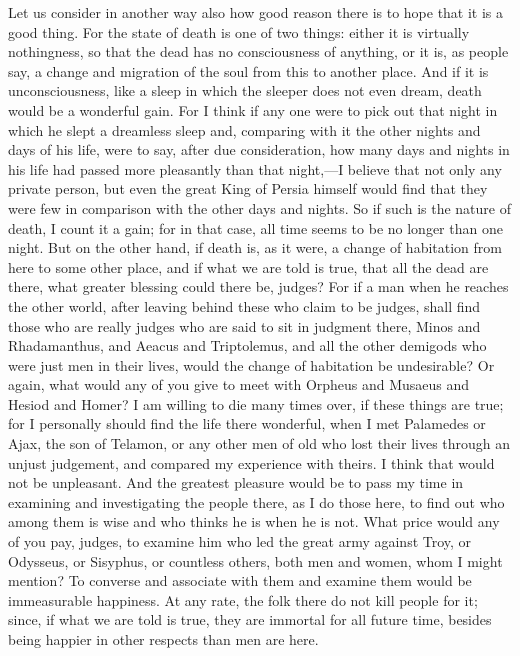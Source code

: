 Let us consider in another way also how good reason there is to hope that it is a good thing. For the state of death is one of two things: either it is virtually nothingness, so that the dead has no consciousness of anything, or it is, as people say, a change and migration of the soul from this to another place. And if it is unconsciousness,  like a sleep in which the sleeper does not even dream, death would be a wonderful gain. For I think if any one were to pick out that night in which he slept a dreamless sleep and, comparing with it the other nights and days of his life, were to say, after due consideration, how many days and nights in his life had passed more pleasantly than that night,—I believe that not only any private person, but even the great King of Persia himself  would find that they were few in comparison with the other days and nights. So if such is the nature of death, I count it a gain; for in that case, all time seems to be no longer than one night. But on the other hand, if death is, as it were, a change of habitation from here to some other place, and if what we are told is true, that all the dead are there, what greater blessing could there be, judges? For if a man when he reaches the other world,  after leaving behind these who claim to be judges, shall find those who are really judges who are said to sit in judgment there, Minos and Rhadamanthus, and Aeacus and Triptolemus, and all the other demigods who were just men in their lives, would the change of habitation be undesirable? Or again, what would any of you give to meet with Orpheus and Musaeus and Hesiod and Homer? I am willing to die many times over, if these things are true; for I personally should find the life there wonderful,  when I met Palamedes or Ajax, the son of Telamon, or any other men of old who lost their lives through an unjust judgement, and compared my experience with theirs. I think that would not be unpleasant. And the greatest pleasure would be to pass my time in examining and investigating the people there, as I do those here, to find out who among them is wise and who thinks he is when he is not. What price would any of you pay, judges, to examine him who led the great army against Troy,  or Odysseus, or Sisyphus, or countless others, both men and women, whom I might mention? To converse and associate with them and examine them would be immeasurable happiness. At any rate, the folk there do not kill people for it; since, if what we are told is true, they are immortal for all future time, besides being happier in other respects than men are here.

